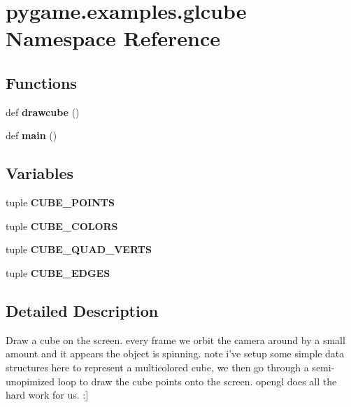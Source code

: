 \hypertarget{namespacepygame_1_1examples_1_1glcube}{}\section{pygame.\+examples.\+glcube Namespace Reference}
\label{namespacepygame_1_1examples_1_1glcube}
\subsection*{Functions}
\begin{DoxyCompactItemize}
\item 
\mbox{\label{namespacepygame_1_1examples_1_1glcube_adb57ef6272333d9c61557a6d5f88990f}} 
def {\bfseries drawcube} ()
\item 
\mbox{\label{namespacepygame_1_1examples_1_1glcube_a259b74ed04506c2df529a0d42cb6f80f}} 
def {\bfseries main} ()
\end{DoxyCompactItemize}
\subsection*{Variables}
\begin{DoxyCompactItemize}
\item 
tuple {\bfseries C\+U\+B\+E\+\_\+\+P\+O\+I\+N\+TS}
\item 
tuple {\bfseries C\+U\+B\+E\+\_\+\+C\+O\+L\+O\+RS}
\item 
tuple {\bfseries C\+U\+B\+E\+\_\+\+Q\+U\+A\+D\+\_\+\+V\+E\+R\+TS}
\item 
tuple {\bfseries C\+U\+B\+E\+\_\+\+E\+D\+G\+ES}
\end{DoxyCompactItemize}


\subsection{Detailed Description}
\begin{DoxyVerb}Draw a cube on the screen. every frame we orbit
the camera around by a small amount and it appears
the object is spinning. note i've setup some simple
data structures here to represent a multicolored cube,
we then go through a semi-unopimized loop to draw
the cube points onto the screen. opengl does all the
hard work for us. :]
\end{DoxyVerb}
 

